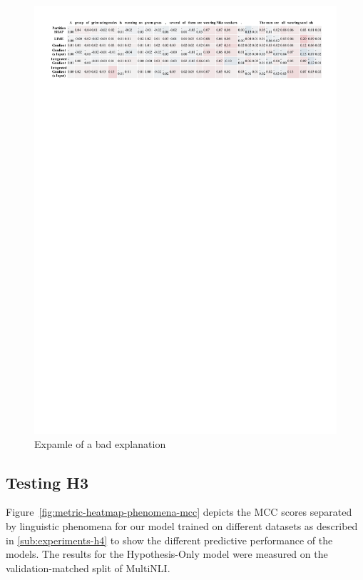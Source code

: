 \begin{figure}[h!]
    \centering
    \includegraphics[width=\textwidth]{./images/ferret_sample.pdf}
    \caption{Expamle of a bad explanation}
    \label{fig:ferret-sample}
\end{figure}

\subsection{Testing H3}
Figure~\ref{fig:metric-heatmap-phenomena-mcc} depicts the \ac{MCC} scores separated by linguistic phenomena for our model trained on different datasets as described in \autoref{sub:experiments-h4} to show the different predictive performance of the models. The results for the Hypothesis-Only model were measured on the validation-matched split of \ac{MultiNLI}.

